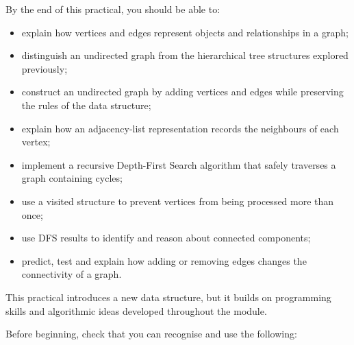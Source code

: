 \documentclass{csc2059practical}
\begin{document}

\begin{learningoutcomes}

By the end of this practical, you should be able to:

\begin{itemize}
\item explain how vertices and edges represent objects and relationships in
a graph;
\item distinguish an undirected graph from the hierarchical tree structures
explored previously;
\item construct an undirected graph by adding vertices and edges while
preserving the rules of the data structure;
\item explain how an adjacency-list representation records the neighbours
of each vertex;
\item implement a recursive Depth-First Search algorithm that safely
traverses a graph containing cycles;
\item use a visited structure to prevent vertices from being processed more
than once;
\item use DFS results to identify and reason about connected components;
\item predict, test and explain how adding or removing edges changes the
connectivity of a graph.
\end{itemize}

\end{learningoutcomes}



This practical introduces a new data structure, but it builds on programming
skills and algorithmic ideas developed throughout the module.

Before beginning, check that you can recognise and use the following:
\end{document}
